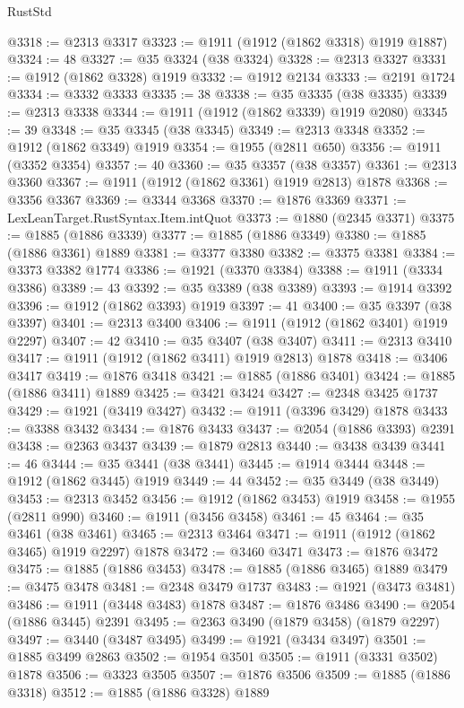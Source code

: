 \begin{lexlean}{RustStd}
\begin{coremodule}
@3318 := @2313 @3317
@3323 := @1911 (@1912 (@1862 @3318) @1919 @1887)
@3324 := 48
@3327 := @35 @3324 (@38 @3324)
@3328 := @2313 @3327
@3331 := @1912 (@1862 @3328) @1919
@3332 := @1912 @2134
@3333 := @2191 @1724
@3334 := @3332 @3333
@3335 := 38
@3338 := @35 @3335 (@38 @3335)
@3339 := @2313 @3338
@3344 := @1911 (@1912 (@1862 @3339) @1919 @2080)
@3345 := 39
@3348 := @35 @3345 (@38 @3345)
@3349 := @2313 @3348
@3352 := @1912 (@1862 @3349) @1919
@3354 := @1955 (@2811 @650)
@3356 := @1911 (@3352 @3354)
@3357 := 40
@3360 := @35 @3357 (@38 @3357)
@3361 := @2313 @3360
@3367 := @1911 (@1912 (@1862 @3361) @1919 @2813) @1878
@3368 := @3356 @3367
@3369 := @3344 @3368
@3370 := @1876 @3369
@3371 := LexLeanTarget.RustSyntax.Item.intQuot
@3373 := @1880 (@2345 @3371)
@3375 := @1885 (@1886 @3339)
@3377 := @1885 (@1886 @3349)
@3380 := @1885 (@1886 @3361) @1889
@3381 := @3377 @3380
@3382 := @3375 @3381
@3384 := @3373 @3382 @1774
@3386 := @1921 (@3370 @3384)
@3388 := @1911 (@3334 @3386)
@3389 := 43
@3392 := @35 @3389 (@38 @3389)
@3393 := @1914 @3392
@3396 := @1912 (@1862 @3393) @1919
@3397 := 41
@3400 := @35 @3397 (@38 @3397)
@3401 := @2313 @3400
@3406 := @1911 (@1912 (@1862 @3401) @1919 @2297)
@3407 := 42
@3410 := @35 @3407 (@38 @3407)
@3411 := @2313 @3410
@3417 := @1911 (@1912 (@1862 @3411) @1919 @2813) @1878
@3418 := @3406 @3417
@3419 := @1876 @3418
@3421 := @1885 (@1886 @3401)
@3424 := @1885 (@1886 @3411) @1889
@3425 := @3421 @3424
@3427 := @2348 @3425 @1737
@3429 := @1921 (@3419 @3427)
@3432 := @1911 (@3396 @3429) @1878
@3433 := @3388 @3432
@3434 := @1876 @3433
@3437 := @2054 (@1886 @3393) @2391
@3438 := @2363 @3437
@3439 := @1879 @2813
@3440 := @3438 @3439
@3441 := 46
@3444 := @35 @3441 (@38 @3441)
@3445 := @1914 @3444
@3448 := @1912 (@1862 @3445) @1919
@3449 := 44
@3452 := @35 @3449 (@38 @3449)
@3453 := @2313 @3452
@3456 := @1912 (@1862 @3453) @1919
@3458 := @1955 (@2811 @990)
@3460 := @1911 (@3456 @3458)
@3461 := 45
@3464 := @35 @3461 (@38 @3461)
@3465 := @2313 @3464
@3471 := @1911 (@1912 (@1862 @3465) @1919 @2297) @1878
@3472 := @3460 @3471
@3473 := @1876 @3472
@3475 := @1885 (@1886 @3453)
@3478 := @1885 (@1886 @3465) @1889
@3479 := @3475 @3478
@3481 := @2348 @3479 @1737
@3483 := @1921 (@3473 @3481)
@3486 := @1911 (@3448 @3483) @1878
@3487 := @1876 @3486
@3490 := @2054 (@1886 @3445) @2391
@3495 := @2363 @3490 (@1879 @3458) (@1879 @2297)
@3497 := @3440 (@3487 @3495)
@3499 := @1921 (@3434 @3497)
@3501 := @1885 @3499 @2863
@3502 := @1954 @3501
@3505 := @1911 (@3331 @3502) @1878
@3506 := @3323 @3505
@3507 := @1876 @3506
@3509 := @1885 (@1886 @3318)
@3512 := @1885 (@1886 @3328) @1889

\end{coremodule}
\end{lexlean}
